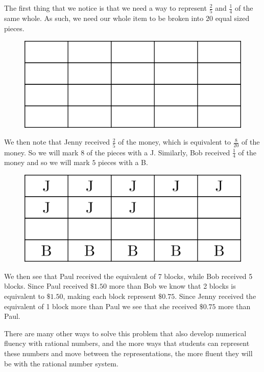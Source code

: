 \documentclass[
]{book}
\theoremstyle{definition}
\theoremstyle{definition}
\theoremstyle{definition}
\theoremstyle{remark}
\begin{document}
The first thing that we notice is that we need a way to represent \(\frac{2}{5}\) and \(\frac{1}{4}\) of the same whole. As such, we need our whole item to be broken into \(20\) equal sized pieces.

\begin{figure}

{\centering \includegraphics[width=0.6\linewidth]{tikz/singapore-fraction1} 

}

\end{figure}

We then note that Jenny received \(\frac{2}{5}\) of the money, which is equivalent to \(\frac{8}{20}\) of the money. So we will mark \(8\) of the pieces with a J. Similarly, Bob received \(\frac{1}{4}\) of the money and so we will mark \(5\) pieces with a B.

\begin{figure}

{\centering \includegraphics[width=0.6\linewidth]{tikz/singapore-fraction2} 

}

\end{figure}

We then see that Paul received the equivalent of 7 blocks, while Bob received 5 blocks. Since Paul received \(\$1.50\) more than Bob we know that 2 blocks is equivalent to \(\$1.50\), making each block represent \(\$0.75\). Since Jenny received the equivalent of 1 block more than Paul we see that she received \(\$0.75\) more than Paul.

There are many other ways to solve this problem that also develop numerical fluency with rational numbers, and the more ways that students can represent these numbers and move between the representations, the more fluent they will be with the rational number system.
\end{document}
